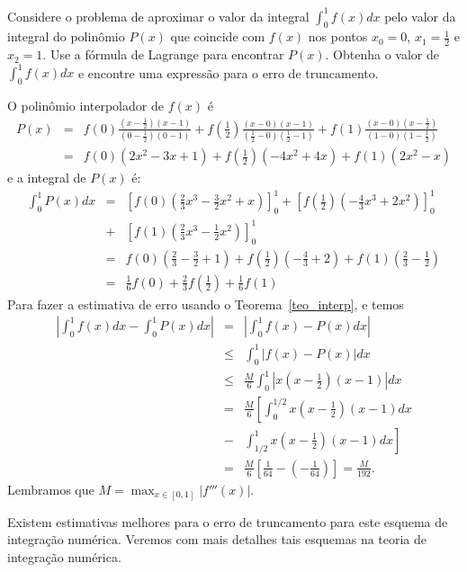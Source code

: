 \begin{ex}\label{exemp_simpson}
Considere o problema de aproximar o valor da integral $\int_0^1 f(x)dx$ pelo valor da integral do polinômio $P(x)$ que coincide com $f(x)$ nos pontos $x_0=0$, $x_1=\frac{1}{2}$ e $x_2=1$. Use a fórmula de Lagrange para encontrar $P(x)$. Obtenha o valor de $\int_0^1f(x)dx$ e encontre uma expressão para o erro de truncamento.
\end{ex}
O polinômio interpolador de $f(x)$ é
\begin{eqnarray*}
P(x)&=&f(0)\frac{(x-\frac{1}{2})(x-1)}{(0-\frac{1}{2})(0-1)}+f\left(\frac{1}{2}\right)\frac{(x-0)(x-1)}{(\frac{1}{2}-0)(\frac{1}{2}-1)}+f(1)\frac{(x-0)(x-\frac{1}{2})}{(1-0)(1-\frac{1}{2})}\\
&=&   f(0)(2x^2-3x+1)+f\left(\frac{1}{2}\right)(-4x^2+4x)+f(1)(2x^2-x)
\end{eqnarray*}
e a integral de $P(x)$ é:
\begin{eqnarray*}
\int_0^1 P(x)dx &=& \left[f(0)\left(\frac{2}{3}x^3 - \frac{3}{2}x^2+x\right)\right]_0^1 + \left[f\left(\frac{1}{2}\right)\left(-\frac{4}{3}x^3+2x^2\right)\right]_0^1 \\
&+& \left[f(1)\left(\frac{2}{3}x^3-\frac{1}{2}x^2\right)\right]_0^1\\
&=& f(0)\left(\frac{2}{3}-\frac{3}{2}+1\right)+f\left(\frac{1}{2}\right)\left(-\frac{4}{3}+2\right)+f(1)\left(\frac{2}{3}-\frac{1}{2}\right)\\
&=& \frac{1}{6}f(0)+\frac{2}{3}f\left(\frac{1}{2}\right)+\frac{1}{6}f(1)
\end{eqnarray*}
Para fazer a estimativa de erro usando o Teorema~\ref{teo_interp}, e temos
\begin{eqnarray*}
\left|\int_0^1f(x)dx-\int_0^1 P(x)dx\right|&=&\left|\int_0^1f(x)- P(x)dx\right|\\
&\leq&\int_0^1|f(x)- P(x)|dx\\
&\leq& \frac{M}{6}  \int_0^1\left|x\left(x-\frac{1}{2}\right)(x-1)\right|dx\\
&=& \frac{M}{6}  \left[\int_0^{1/2}x\left(x-\frac{1}{2}\right)(x-1)dx\right.\\
&-&\left.\int_{1/2}^1x\left(x-\frac{1}{2}\right)(x-1)dx\right]\\
&=& \frac{M}{6}  \left[\frac{1}{64}-\left(-\frac{1}{64}\right)\right]=\frac{M}{192}.
\end{eqnarray*}
Lembramos que $M=\max_{x\in[0,1]}|f'''(x)|$.

\begin{obs}Existem estimativas melhores para o erro de truncamento para este esquema de integração numérica. Veremos com mais detalhes tais esquemas na teoria de integração numérica.
\end{obs}

